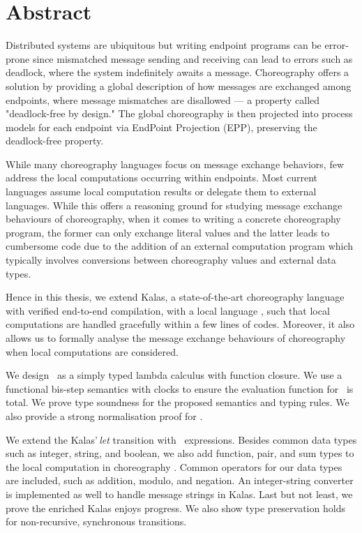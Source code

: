 \chapter*{Abstract}

Distributed systems are ubiquitous but writing endpoint programs can be 
error-prone since mismatched message sending and receiving can lead to 
errors such as deadlock, where the system indefinitely awaits a message.
Choreography offers a solution by providing a global description of how 
messages are exchanged among endpoints, where message mismatches are disallowed ---
a property called "deadlock-free by design." The global choreography 
is then projected into process models for each endpoint via EndPoint Projection (EPP),
preserving the deadlock-free property.

While many choreography languages focus on message exchange behaviors, few address 
the local computations occurring within endpoints. Most current languages assume local 
computation results or delegate them to external languages. While this offers a reasoning 
ground for studying message exchange behaviours of choreography, when it comes to writing 
a concrete choreography program, the former can only exchange literal values and the 
latter leads to cumbersome code due to the addition of an external computation program which 
typically involves conversions between choreography values and external data types.

Hence in this thesis, we extend Kalas, a state-of-the-art choreography language with
verified end-to-end compilation, with a local language \richerlang, such that
local computations are handled gracefully within a few lines of codes. Moreover,
it also allows us to formally analyse the message exchange behaviours of choreography 
when local computations are considered. 

We design \richerlang\, as a simply typed lambda calculus with function closure. We use
a functional bis-step semantics with clocks to ensure the evaluation function for
\richerlang\, is total. We prove type soundness for the proposed semantics and typing rules. 
We also provide a strong normalisation proof for \richerlang.

We extend the Kalas'\,\textit{let} transition with \richerlang\, expressions. Besides common data types 
such as integer, string, and boolean, we also add function, pair, and sum types to the 
local computation in choreography . Common operators for our data types are included, such as addition, modulo, 
and negation. An integer-string converter is implemented as well to handle message strings 
in Kalas. Last but not least, we prove the enriched Kalas enjoys progress. We also show
type preservation holds for non-recursive, synchronous transitions.



